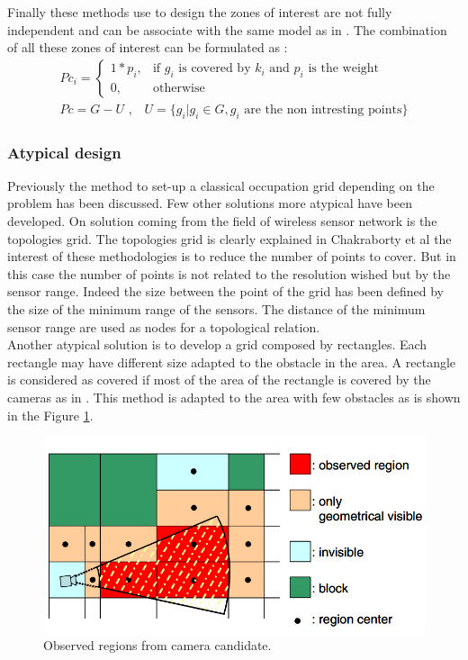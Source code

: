 Finally  these methods use to design the zones of interest are not fully independent and can be associate with the same model as in \cite{141*akbarzadeh2013,171*horster2006,84*xu2011}. The combination of all these  zones of interest can be formulated as : 
 \begin{align}\label{eq:PcFull}
Pc_i= \begin{cases} 1*p_i, & \mbox{if } g_i\mbox{ is covered  by $k_i$ and  $p_i$ is the weight} \\ 0, & \mbox{otherwise}  \end{cases}
\\ Pc=G-U \mbox{ ,    }  \mbox{ }U= \{ g_i | g_i \in G, g_i \mbox{ are the non intresting points} \}
\end{align}

   
\subsubsection{Atypical design}  

Previously the method to set-up a classical occupation grid depending on the problem has been discussed. Few other solutions more atypical have been developed. On solution coming from the field of wireless sensor network is the topologies grid. 
 The topologies grid is clearly explained in Chakraborty et al \cite{150*chakrabarty2002} the interest of these methodologies is to reduce the number of points to cover. But in this case the number of points is not related to the resolution wished  but by the sensor range. Indeed the size between the point of the grid has been defined by the size of the minimum range of the sensors. The distance of the minimum sensor range are used as nodes for a topological relation. \\
Another atypical solution is to develop a grid composed by rectangles. Each rectangle may have different size adapted to the obstacle in the area. A rectangle is considered as covered if most of the area of the rectangle is covered by the cameras as in \citep{170*yabuta2008}. This method is adapted to the area with few obstacles as is shown in the Figure \ref{fig:from170}.
\begin{figure}[t!]
\begin{center}
   \includegraphics[width=\linewidth]{img/from170.png}
  \caption{Observed regions from camera candidate.}\label{fig:from170}
  \endminipage\hfill
  \end{center}
\end{figure}

